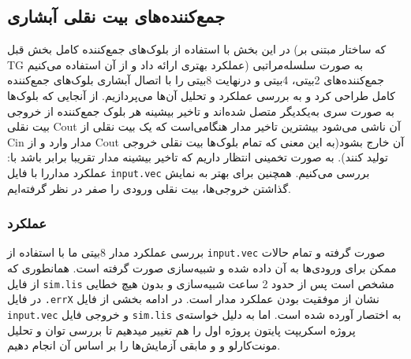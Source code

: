 
\subsection{
    جمع‌کننده‌های بیت نقلی آبشاری
    \protect{}
}
در این بخش با استفاده از بلوک‌های جمع‌کننده کامل بخش قبل (که ساختار مبتنی بر TG عملکرد بهتری ارائه داد و از آن استفاده می‌کنیم) به صورت سلسله‌مراتبی جمع‌کننده‌های 2بیتی، 4بیتی و درنهایت 8بیتی را با اتصال آبشاری بلوک‌های جمع‌کننده کامل طراحی کرد و به بررسی عملکرد و تحلیل آن‌ها می‌پردازیم.
از آنجایی که بلوک‌ها به صورت سری به‌یکدیگر متصل شده‌اند و تاخیر بیشینه هر بلوک جمع‌کننده از خروجی بیت نقلی Cout آن ناشی می‌شود بیشترین تاخیر مدار هنگامی‌است که یک بیت نقلی از Cin مدار وارد و از Cout آن خارج بشود(به این معنی که تمام بلوک‌ها بیت نقلی خروجی تولید کنند). به صورت تخمینی انتظار داریم که تاخیر بیشینه مدار  تقریبا برابر باشد با:
عملکرد مدار‌را با فایل \texttt{input.vec} بررسی می‌کنیم. همچنین برای بهتر به نمایش گذاشتن خروجی‌ها، بیت نقلی ورودی را صفر در نظر گرفته‌ایم.

\vspace{1cm}


\newpage




\newpage
\subsubsection{عملکرد}
بررسی عملکرد مدار 8بیتی ما با استفاده از \texttt{input.vec} صورت گرفته و تمام حالات ممکن برای ورودی‌ها به آن داده شده و شبیه‌سازی صورت گرفته است.
همانطوری که از فایل \texttt{sim.lis} مشخص است پس از حدود 2 ساعت شبیه‌سازی و بدون هیچ خطایی در فایل \texttt{.errX} نشان از موفقیت بودن عملکرد مدار است.
در ادامه بخشی از فایل \texttt{input.vec} و خروجی فایل \texttt{sim.lis} به اختصار آورده شده است.
اما به دلیل خواسته‌ی پروژه اسکریپت پایتون پروژه اول را هم تغییر میدهیم تا بررسی توان و تحلیل مونت‌کارلو و و مابقی آزمایش‌ها را بر اساس آن انجام دهیم.
\vspace{-0.2cm}


